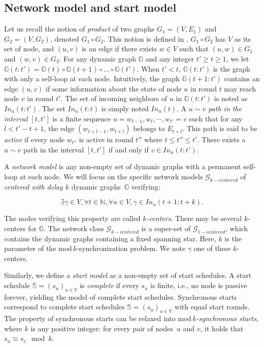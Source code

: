 \documentclass[11pt,letterpaper]{article}
\newcommand{\cent}{\gamma}
\begin{document}
\subsection{Network model and start model}

Let us recall the notion of \textit{product} of two graphs $G_1 = (V, E_1)$ and $G_2 = (V, G_2)$, denoted $G_1 \circ G_2$. This notion is defined in \cite{CBM19}.
$G_1 \circ G_2$ has $V$ as its set of node, and $(u,v)$ is an edge if there exists $w \in V$ such that $(u,w) \in G_1$ and $(w,v) \in G_2$.
For any dynamic graph $\mathds{G}$ and any integer $t' \geq t \geq 1$, we let $\mathds{G}(t:t') = \mathds{G}(t) \circ \mathds{G}(t+1) \circ \dots \circ \mathds{G}(t')$.
When $t' < t$, $\mathds{G}(t:t')$ is the graph with only a self-loop at each node.
Intuitively, the graph $\mathds{G}(t+1:t')$ contains an edge $(u,v)$ if some information about the state of node $u$ in round $t$ may reach node $v$ in round $t'$.
The set of incoming neighbors of $u$ in $\mathds{G}(t:t')$ is noted as $In_u(t:t')$.
The set $In_u(t:t)$ is simply noted $In_u(t)$.
A \textit{$u \sim v$ path in the interval $[t,t']$} is a finite sequence $u = w_{t-1}, w_t, \cdots, w_{t'} = v$
such that for any $l < t'-t+1$, the edge $(w_{t+l-1},w_{t+l})$ belongs to $E_{t+l}$.
This path is said to be \textit{active} if every node $w_{t''}$ is active in round $t''$ where $t \leq t'' \leq t'$.
There exists a $u \sim v$ path in the interval $[t,t']$ if and only if $v \in In_u(t:t')$.

A \emph{network model} is any non-empty set of dynamic graphs with a permanent self-loop at each node.
We will focus on the specific network models $\mathcal{G}_{k-centered}$ of \emph{centered with delay $k$} dynamic graphs~$\mathds{G}$ verifying: 

$$\exists \cent \in V, \forall t \in \mathds{N}, \forall u \in V, \cent \in In_u(t+1:t+k).$$

The nodes verifying this property are called \textit{$k$-centers}.
There may be several $k$-centers for $\mathds{G}$.
The network class $\mathcal{G}_{k-centered}$ is a super-set of $\mathcal{G}_{1-centered}$, which contains the dynamic graphs containing a fixed spanning star.
Here, $k$ is the parameter of the $\mathrm{mod}\,k$-synchronization problem.
We note $\cent$ one of these $k$-centers.

Similarly, we define a \emph{start model} as a non-empty set of start schedules.
A start schedule $\mathds{S} = (s_u)_{u\in V}$ is \emph{complete} if every $s_u$ is finite, i.e.,
no node is passive forever, yielding the model of complete start schedules.
Synchronous starts correspond to complete start schedules $\mathds{S} = (s_u)_{u\in V}$ with
equal start rounds.	
The property of synchronous starts can be relaxed into \emph{$\mathrm{mod}\,k$-synchronous starts},
where $k$ is any positive integer: for every pair of nodes~$u$ and $v$, it holds that $s_u \equiv s_v \!\mod k$.
\end{document}
